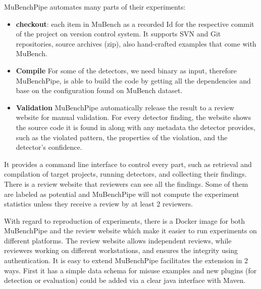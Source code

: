 \documentclass[authoryear,preprint]{sigplanconf}
\begin{document}
MuBenchPipe automates many parts of their experiments:
\begin{itemize}
	\item \textbf{checkout}: each item in MuBench as a recorded Id for the respective commit of the project on version control system. It supports SVN and Git repositories, source archives (zip), also hand-crafted examples that come with MuBench.
	\item \textbf{Compile} For some of the detectors, we need binary as input, therefore MuBenchPipe, is able to build the code by getting all the dependencies and base on the configuration found on MuBench dataset. 
	\item \textbf{Validation} MuBenchPipe automatically release the result to a review website for manual validation. For every detector finding, the website shows the source code it is found in along with any metadata the detector provides, such as the violated pattern, the properties of the violation, and the detector’s confidence\cite{8338426}.
\end{itemize}

It provides a command line interface to control every part, such as retrieval and compilation of target projects, running detectors, and collecting their findings. There is a review website that reviewers can see all the findings. Some of them are labeled as potential and MuBenchPipe will not compute the experiment statistics unless they receive a review by at least 2 reviewers. 

With regard to reproduction of experiments, there is a Docker image for both MuBenchPipe and the review website which make it easier to run experiments on different platforms. The review website allows independent reviews, while reviewers working on different workstations, and ensures the integrity using authentication. It is easy to extend MuBenchPipe facilitates the extension in 2 ways. First it has a simple data schema for misuse examples and new plugins (for detection or evaluation) could be added via a clear java interface with Maven. 
\end{document}
